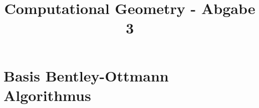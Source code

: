 \documentclass[conference]{IEEEtran}
\begin{document}
	
	\title{Computational Geometry - Abgabe 3}
	
	\author{
	}
	
	\maketitle
	
	\begin{abstract}
		
		
	\end{abstract}
	
	\section{Basis Bentley-Ottmann Algorithmus}
	
\end{document}
